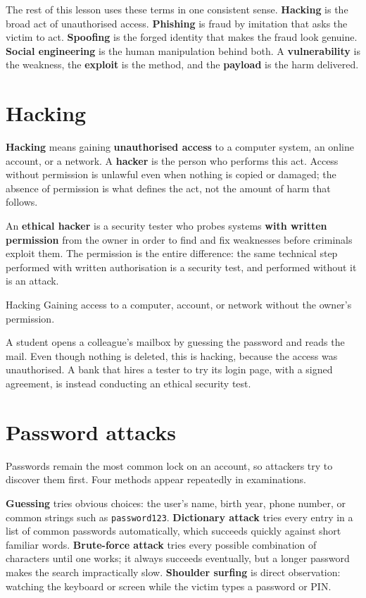 The rest of this lesson uses these terms in one consistent sense.
\textbf{Hacking} is the broad act of unauthorised access.
\textbf{Phishing} is fraud by imitation that asks the victim to act.
\textbf{Spoofing} is the forged identity that makes the fraud look
genuine. \textbf{Social engineering} is the human manipulation behind
both. A \textbf{vulnerability} is the weakness, the \textbf{exploit} is
the method, and the \textbf{payload} is the harm delivered.

\section{Hacking}
\textbf{Hacking} means gaining \textbf{unauthorised access} to a
computer system, an online account, or a network. A \textbf{hacker} is
the person who performs this act. Access without permission is unlawful
even when nothing is copied or damaged; the absence of permission is
what defines the act, not the amount of harm that follows.

An \textbf{ethical hacker} is a security tester who probes systems
\textbf{with written permission} from the owner in order to find and fix
weaknesses before criminals exploit them. The permission is the entire
difference: the same technical step performed with written authorisation
is a security test, and performed without it is an attack.

\begin{definitionbox}{Hacking}
Gaining access to a computer, account, or network without the owner's
permission.
\end{definitionbox}

\begin{example}
A student opens a colleague's mailbox by guessing the password and
reads the mail. Even though nothing is deleted, this is hacking,
because the access was unauthorised. A bank that hires a tester to try
its login page, with a signed agreement, is instead conducting an
ethical security test.
\end{example}

\section{Password attacks}
Passwords remain the most common lock on an account, so attackers try
to discover them first. Four methods appear repeatedly in examinations.

\textbf{Guessing} tries obvious choices: the user's name, birth year,
phone number, or common strings such as \texttt{password123}.
\textbf{Dictionary attack} tries every entry in a list of common
passwords automatically, which succeeds quickly against short familiar
words. \textbf{Brute-force attack} tries every possible combination of
characters until one works; it always succeeds eventually, but a longer
password makes the search impractically slow. \textbf{Shoulder surfing}
is direct observation: watching the keyboard or screen while the victim
types a password or PIN.

